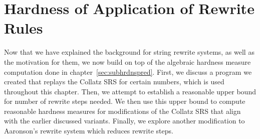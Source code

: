 

\chapter{Hardness of Application of Rewrite Rules} \label{sec:hardnessrewriterules}
Now that we have explained the background for string rewrite systems, as well as the motivation for them, we now build on top of the  algebraic hardness measure computation done in chapter~\ref{sec:subhrdnspred}. First, we discuss a program we created that replays the Collatz SRS for certain numbers, which is used throughout this chapter. Then, we attempt to establish a reasonable upper bound for number of rewrite steps needed. We then use this upper bound to compute reasonable hardness measures for modifications of the Collatz SRS that align with the earlier discussed variants. Finally, we explore another modification to Aaronson's rewrite system which reduces rewrite steps.%
